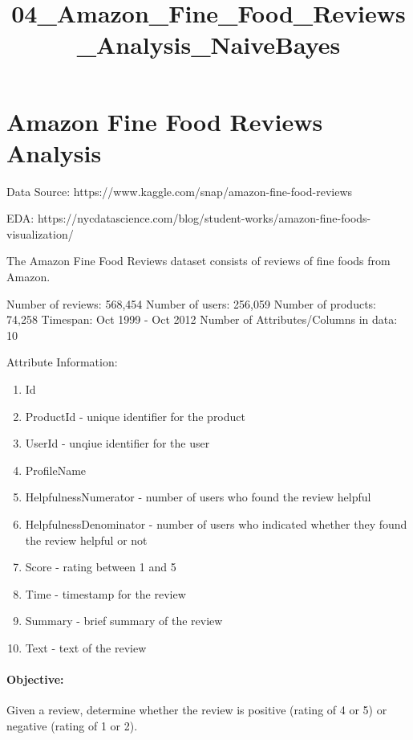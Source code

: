 \documentclass[11pt]{article}
\title{04\_Amazon\_Fine\_Food\_Reviews\_Analysis\_NaiveBayes}
\providecommand{\tightlist}{%
      \setlength{\itemsep}{0pt}\setlength{\parskip}{0pt}}
\begin{document}
    
    
    \maketitle
    
    

    
    \section{Amazon Fine Food Reviews
Analysis}\label{amazon-fine-food-reviews-analysis}

Data Source: https://www.kaggle.com/snap/amazon-fine-food-reviews

EDA:
https://nycdatascience.com/blog/student-works/amazon-fine-foods-visualization/

The Amazon Fine Food Reviews dataset consists of reviews of fine foods
from Amazon.

Number of reviews: 568,454 Number of users: 256,059 Number of products:
74,258 Timespan: Oct 1999 - Oct 2012 Number of Attributes/Columns in
data: 10

Attribute Information:

\begin{enumerate}
\def\labelenumi{\arabic{enumi}.}
\tightlist
\item
  Id
\item
  ProductId - unique identifier for the product
\item
  UserId - unqiue identifier for the user
\item
  ProfileName
\item
  HelpfulnessNumerator - number of users who found the review helpful
\item
  HelpfulnessDenominator - number of users who indicated whether they
  found the review helpful or not
\item
  Score - rating between 1 and 5
\item
  Time - timestamp for the review
\item
  Summary - brief summary of the review
\item
  Text - text of the review
\end{enumerate}

\paragraph{Objective:}\label{objective}

Given a review, determine whether the review is positive (rating of 4 or
5) or negative (rating of 1 or 2).
\end{document}
